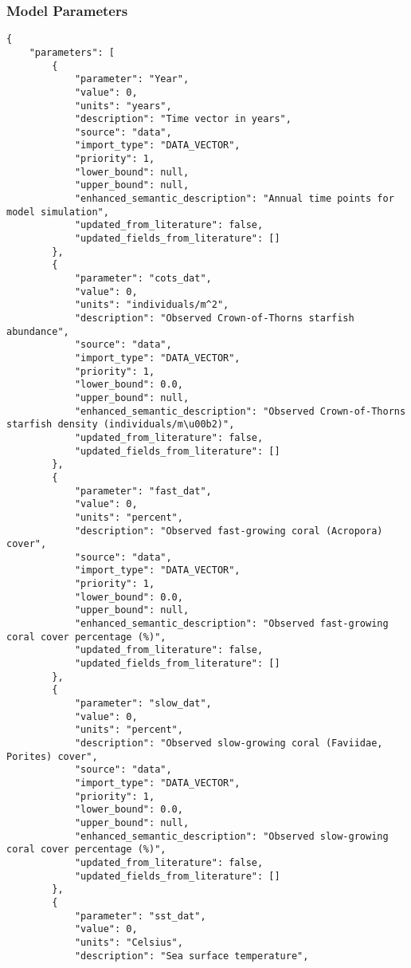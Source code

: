 \subsubsection{Model Parameters}
\begin{lstlisting}
{
    "parameters": [
        {
            "parameter": "Year",
            "value": 0,
            "units": "years",
            "description": "Time vector in years",
            "source": "data",
            "import_type": "DATA_VECTOR",
            "priority": 1,
            "lower_bound": null,
            "upper_bound": null,
            "enhanced_semantic_description": "Annual time points for model simulation",
            "updated_from_literature": false,
            "updated_fields_from_literature": []
        },
        {
            "parameter": "cots_dat",
            "value": 0,
            "units": "individuals/m^2",
            "description": "Observed Crown-of-Thorns starfish abundance",
            "source": "data",
            "import_type": "DATA_VECTOR",
            "priority": 1,
            "lower_bound": 0.0,
            "upper_bound": null,
            "enhanced_semantic_description": "Observed Crown-of-Thorns starfish density (individuals/m\u00b2)",
            "updated_from_literature": false,
            "updated_fields_from_literature": []
        },
        {
            "parameter": "fast_dat",
            "value": 0,
            "units": "percent",
            "description": "Observed fast-growing coral (Acropora) cover",
            "source": "data",
            "import_type": "DATA_VECTOR",
            "priority": 1,
            "lower_bound": 0.0,
            "upper_bound": null,
            "enhanced_semantic_description": "Observed fast-growing coral cover percentage (%)",
            "updated_from_literature": false,
            "updated_fields_from_literature": []
        },
        {
            "parameter": "slow_dat",
            "value": 0,
            "units": "percent",
            "description": "Observed slow-growing coral (Faviidae, Porites) cover",
            "source": "data",
            "import_type": "DATA_VECTOR",
            "priority": 1,
            "lower_bound": 0.0,
            "upper_bound": null,
            "enhanced_semantic_description": "Observed slow-growing coral cover percentage (%)",
            "updated_from_literature": false,
            "updated_fields_from_literature": []
        },
        {
            "parameter": "sst_dat",
            "value": 0,
            "units": "Celsius",
            "description": "Sea surface temperature",

\end{lstlisting}
